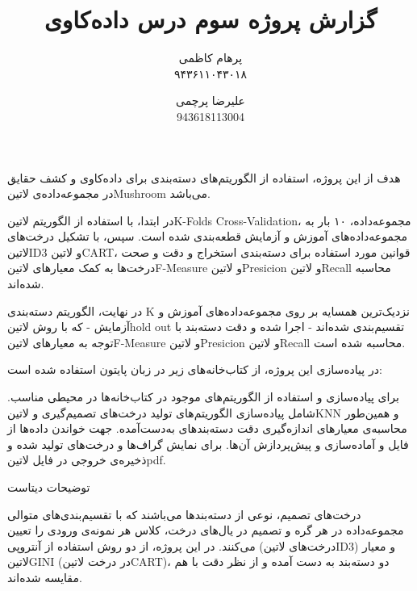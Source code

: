 \documentclass[a4paper,12pt]{article}
\title{گزارش پروژه سوم درس داده‌کاوی}
\author{
پرهام کاظمی \\ ۹۴۳۶۱۱۰۴۳۰۱۸
\and
علیرضا پرچمی \\ 943618113004
}
\begin{document}
	\maketitle
	

هدف از این پروژه، استفاده از الگوریتم‌های دسته‌بندی  برای داده‌کاوی و کشف حقایق در مجموعه‌داده‌ی ‌لاتین{Mushroom} می‌باشد.

در ابتدا، با استفاده از الگوریتم ‌لاتین{K-Folds Cross-Validation}، مجموعه‌داده، ۱۰ بار به مجموعه‌داده‌های آموزش و آزمایش قطعه‌بندی شده است. سپس، با تشکیل درخت‌های ‌لاتین{ID3} و ‌لاتین{CART}، قوانین مورد استفاده برای دسته‌بندی استخراج و دقت و صحت درخت‌ها به کمک معیارهای ‌لاتین{F-Measure} و ‌لاتین{Presicion} و ‌لاتین{Recall} محاسبه شده‌اند. 

در نهایت، الگوریتم دسته‌بندی K نزدیک‌ترین همسایه  بر روی مجموعه‌داده‌های آموزش و آزمایش - که با روش ‌لاتین{hold out} تقسیم‌بندی شده‌اند - اجرا شده و دقت دسته‌بند با توجه به معیارهای  ‌لاتین{F-Measure} و ‌لاتین{Presicion} و ‌لاتین{Recall} محاسبه شده‌ است.
	
	
	در پیاده‌سازی این پروژه، از کتاب‌خانه‌های زیر در زبان پایتون استفاده شده است:
	
		  برای پیاده‌سازی و استفاده از الگوریتم‌های موجود در کتاب‌خانه‌ها در محیطی مناسب.
		 شامل پیاده‌سازی الگوریتم‌های تولید درخت‌های تصمیم‌گیری و ‌لاتین{KNN} و همین‌طور محاسبه‌ی معیارهای اندازه‌گیری دقت دسته‌بندهای به‌دست‌آمده.
		 جهت خواندن داده‌ها از فایل و آماده‌سازی و پیش‌پردازش آن‌ها.
		 برای نمایش گراف‌ها و درخت‌های تولید شده و ذخیره‌ی خروجی در فایل ‌لاتین{pdf}.
	
	
	توضیحات دیتاست
	
	
	درخت‌های تصمیم، نوعی از دسته‌بندها می‌باشند که با تقسیم‌بندی‌های متوالی مجموعه‌داده در هر گره و تصمیم در یال‌های درخت، کلاس هر نمونه‌ی ورودی را تعیین می‌کنند. در این پروژه، از دو روش استفاده از آنتروپی (درخت‌های ‌لاتین{ID3}) و معیار ‌لاتین{GINI} (در درخت ‌لاتین{CART})، دو دسته‌بند به دست آمده و از نظر دقت با هم مقایسه شده‌اند.
	
\end{document}
